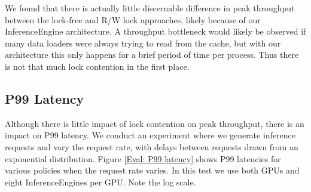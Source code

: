 We found that there is actually little discernable difference in peak throughput between the lock-free and R/W lock approaches, likely because of our InferenceEngine architecture. A throughput bottleneck would likely be observed if many data loaders were always trying to read from the cache, but with our architecture this only happens for a brief period of time per process. Thus there is not that much lock contention in the first place.

\subsection{P99 Latency}
Although there is little impact of lock contention on peak throughput, there is an impact on P99 latency. We conduct an experiment where we generate inference requests and vary the request rate, with delays between requests drawn from an exponential distribution. Figure \ref{Eval: P99 latency} shows P99 latencies for various policies when the request rate varies. In this test we use both GPUs and eight InferenceEngines per GPU. Note the log scale.

